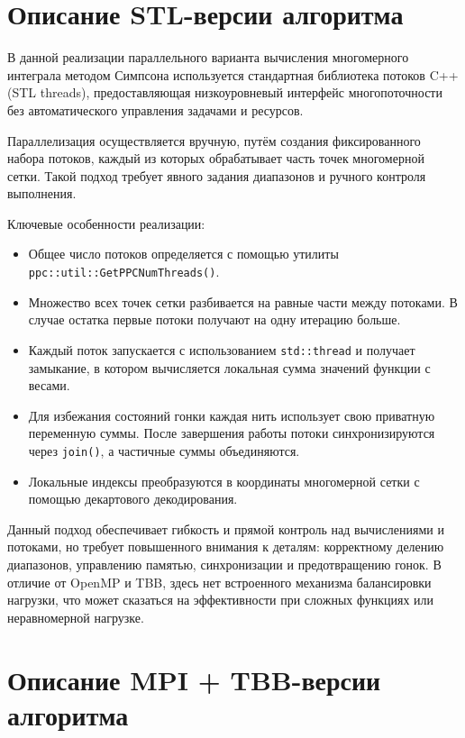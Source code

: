 \documentclass[14pt,a4paper]{extarticle}
\begin{document}
\section{Описание STL-версии алгоритма}

В данной реализации параллельного варианта вычисления многомерного интеграла методом Симпсона используется стандартная библиотека потоков C++ (STL threads), предоставляющая низкоуровневый интерфейс многопоточности без автоматического управления задачами и ресурсов.

Параллелизация осуществляется вручную, путём создания фиксированного набора потоков, каждый из которых обрабатывает часть точек многомерной сетки. Такой подход требует явного задания диапазонов и ручного контроля выполнения.

Ключевые особенности реализации:

\begin{itemize}
    \item Общее число потоков определяется с помощью утилиты \texttt{ppc::util::GetPPCNumThreads()}.
    
    \item Множество всех точек сетки разбивается на равные части между потоками. В случае остатка первые потоки получают на одну итерацию больше.
    
    \item Каждый поток запускается с использованием \texttt{std::thread} и получает замыкание, в котором вычисляется локальная сумма значений функции с весами.
    
    \item Для избежания состояний гонки каждая нить использует свою приватную переменную суммы. После завершения работы потоки синхронизируются через \texttt{join()}, а частичные суммы объединяются.
    
    \item Локальные индексы преобразуются в координаты многомерной сетки с помощью декартового декодирования.
\end{itemize}

Данный подход обеспечивает гибкость и прямой контроль над вычислениями и потоками, но требует повышенного внимания к деталям: корректному делению диапазонов, управлению памятью, синхронизации и предотвращению гонок. В отличие от OpenMP и TBB, здесь нет встроенного механизма балансировки нагрузки, что может сказаться на эффективности при сложных функциях или неравномерной нагрузке.

\section{Описание MPI + TBB-версии алгоритма}
\end{document}
